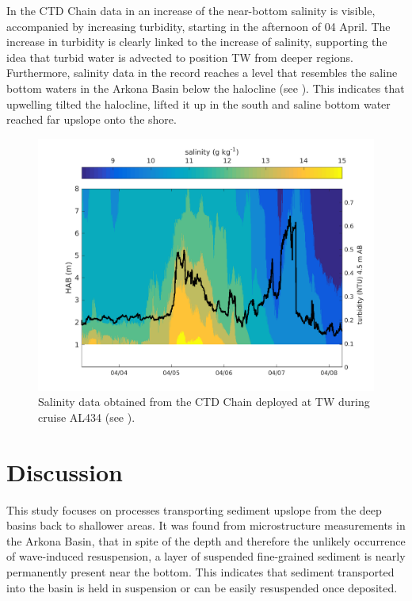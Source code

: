  In the CTD Chain data in  an increase of the 
near-bottom salinity is visible, accompanied by increasing turbidity, starting 
in the 
afternoon of 04 April. The increase in turbidity is clearly linked to the 
increase of salinity, supporting the idea that turbid water is advected to 
position TW from deeper 
regions. Furthermore, salinity data in the record reaches a level that 
resembles the saline bottom waters in the Arkona Basin below the 
halocline (see ). This indicates that upwelling 
tilted the halocline, lifted it up in the south and saline bottom water 
reached far upslope onto the shore.

 \begin{figure}[ht]
\includegraphics[width=17cm]{bilder/ctdchaintw.png}
 \caption{Salinity data obtained from the CTD Chain deployed at TW 
during cruise AL434 (see ).}
 \label{ctdchain}
 \end{figure}

\FloatBarrier
\section{Discussion}

This study focuses on processes transporting sediment upslope 
from the deep basins back to shallower areas. It was found from 
microstructure measurements in the Arkona Basin, that in spite of the depth and 
therefore the unlikely occurrence of wave-induced resuspension, a layer of 
suspended fine-grained sediment is nearly permanently present near the bottom. 
This indicates that sediment transported into the basin is held in 
suspension or can be easily resuspended once deposited.

